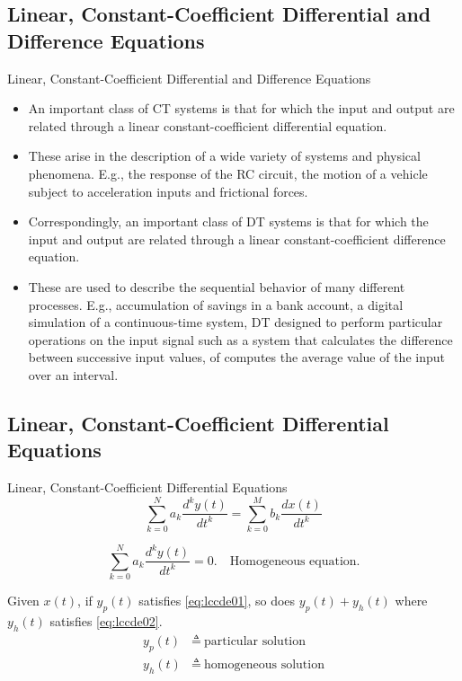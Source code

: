\subsection{Linear, Constant-Coefficient Differential and Difference Equations}
\begin{frame}{Linear, Constant-Coefficient Differential and Difference Equations}
    \begin{itemize}
      \item An important class of CT systems is that for which the input and output are related through a linear constant-coefficient differential equation.
      \item These arise in the description of a wide variety of systems and physical phenomena. E.g., the response of the RC circuit, the motion of a vehicle subject to acceleration inputs and frictional forces.
      \item Correspondingly, an important class of DT systems is that for which the input and output are related through a linear constant-coefficient difference equation.
      \item These are used to describe the sequential behavior of many different processes. E.g., accumulation of savings in a bank account, a digital simulation of a continuous-time system, DT designed to perform particular operations on the input signal such as a system that calculates the difference between successive input values, of computes the average value of the input over an interval.
    \end{itemize}
\end{frame}

\subsection{Linear, Constant-Coefficient Differential Equations}

\begin{frame}{Linear, Constant-Coefficient Differential Equations}
    \begin{equation}\label{eq:lccde01}
        \sum_{k=0}^{N}a_k \frac{d^ky(t)}{dt^k} = \sum_{k=0}^{M}b_k \frac{dx(t)}{dt^k}
    \end{equation}

    \begin{equation}\label{eq:lccde02}
        \sum_{k=0}^{N}a_k \frac{d^ky(t)}{dt^k} = 0.\quad \text{Homogeneous equation.}
    \end{equation}

     Given $x(t)$, if $y_p(t)$ satisfies \ref{eq:lccde01}, so does $y_p(t) + y_h(t)$ where $y_h(t)$ satisfies \ref{eq:lccde02}.
     \begin{align*}
       y_p(t) &\triangleq~\text{particular solution} \\
       y_h(t) &\triangleq~\text{homogeneous solution} \\
     \end{align*}
\end{frame}



